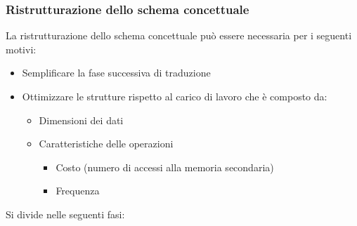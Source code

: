 \documentclass[a4paper,twoside]{article}
\begin{document}
\subsubsection{Ristrutturazione dello schema concettuale}
La ristrutturazione dello schema concettuale può essere necessaria per i seguenti motivi:
\begin{itemize}
  \item Semplificare la fase successiva di traduzione
  \item Ottimizzare le strutture rispetto al carico di lavoro che è composto da:
    \begin{itemize}
      \item Dimensioni dei dati
      \item Caratteristiche delle operazioni
        \begin{itemize}
          \item Costo (numero di accessi alla memoria secondaria)
          \item Frequenza
        \end{itemize}
    \end{itemize}
\end{itemize}
Si divide nelle seguenti fasi:
\end{document}

